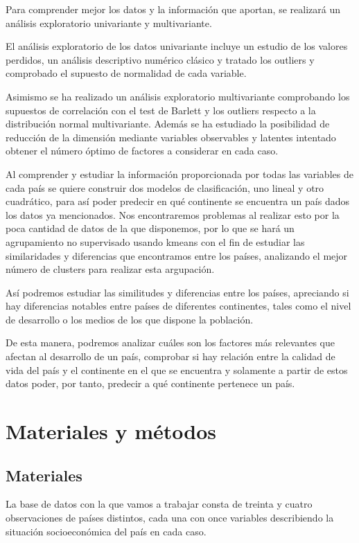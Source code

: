 \documentclass[twoside,openright,titlepage,numbers=noenddot,openany,headinclude,footinclude=true,
cleardoublepage=empty,abstractoff,BCOR=5mm,paper=a4,fontsize=12pt,main=spanish]{scrreprt}
\begin{document}
Para comprender mejor los datos y la información que aportan, se realizará un análisis exploratorio univariante y multivariante.

El análisis exploratorio de los datos univariante incluye un estudio de los valores perdidos, un análisis descriptivo numérico clásico y tratado los outliers y comprobado el supuesto de normalidad de cada variable.

Asimismo se ha realizado un análisis exploratorio multivariante comprobando los supuestos de correlación con el test de Barlett y los outliers respecto a la distribución normal multivariante. Además se ha estudiado la posibilidad de reducción de la dimensión mediante variables observables y latentes intentado obtener el número óptimo de factores a considerar en cada caso.

Al comprender y estudiar la información proporcionada por todas las variables de cada país se quiere construir dos modelos de clasificación, uno lineal y otro cuadrático, para así poder predecir en qué continente se encuentra un país dados los datos ya mencionados. Nos encontraremos problemas al realizar esto por la poca cantidad de datos de la que disponemos, por lo que se hará un agrupamiento no supervisado usando kmeans con el fin de estudiar las similaridades y diferencias que encontramos entre los países, analizando el mejor número de clusters para realizar esta argupación.

Así podremos estudiar las similitudes y diferencias entre los países, apreciando si hay diferencias notables entre países de diferentes continentes, tales como el nivel de desarrollo o los medios de los que dispone la población.

De esta manera, podremos analizar cuáles son los factores más relevantes que afectan al desarrollo de un país, comprobar si hay relación entre la calidad de vida del país y el continente en el que se encuentra y solamente a partir de estos datos poder, por tanto, predecir a qué continente pertenece un país.

\section{Materiales y métodos}

\subsection{Materiales}

La base de datos con la que vamos a trabajar consta de treinta y cuatro observaciones de países distintos, cada una con once variables describiendo la situación socioeconómica del país en cada caso.
\end{document}
